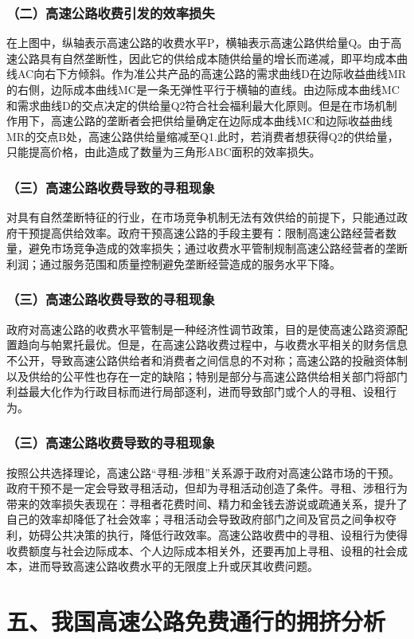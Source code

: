 \documentclass[aspectratio=169, 12pt]{beamer}
\begin{document}
\begin{frame}[plain]
    \frametitle{（二）高速公路收费引发的效率损失}
    在上图中，纵轴表示高速公路的收费水平P，横轴表示高速公路供给量Q。由于高速公路具有自然垄断性，因此它的供给成本随供给量的增长而递减，即平均成本曲线AC向右下方倾斜。作为准公共产品的高速公路的需求曲线D在边际收益曲线MR的右侧，边际成本曲线MC是一条无弹性平行于横轴的直线。由边际成本曲线MC和需求曲线D的交点决定的供给量Q2符合社会福利最大化原则。但是在市场机制作用下，高速公路的垄断者会把供给量确定在边际成本曲线MC和边际收益曲线MR的交点B处，高速公路供给量缩减至Q1.此时，若消费者想获得Q2的供给量，只能提高价格，由此造成了数量为三角形ABC面积的效率损失。
\end{frame}

\begin{frame}[plain]
    \frametitle{（三）高速公路收费导致的寻租现象}
    对具有自然垄断特征的行业，在市场竞争机制无法有效供给的前提下，只能通过政府干预提高供给效率。政府干预高速公路的手段主要有：限制高速公路经营者数量，避免市场竞争造成的效率损失；通过收费水平管制规制高速公路经营者的垄断利润；通过服务范围和质量控制避免垄断经营造成的服务水平下降。
\end{frame}

\begin{frame}[plain]
    \frametitle{（三）高速公路收费导致的寻租现象}
    政府对高速公路的收费水平管制是一种经济性调节政策，目的是使高速公路资源配置趋向与帕累托最优。但是，在高速公路收费过程中，与收费水平相关的财务信息不公开，导致高速公路供给者和消费者之间信息的不对称；高速公路的投融资体制以及供给的公平性也存在一定的缺陷；特别是部分与高速公路供给相关部门将部门利益最大化作为行政目标而进行局部逐利，进而导致部门或个人的寻租、设租行为。
\end{frame}

\begin{frame}[plain]
    \frametitle{（三）高速公路收费导致的寻租现象}
    按照公共选择理论，高速公路“寻租-涉租”关系源于政府对高速公路市场的干预。政府干预不是一定会导致寻租活动，但却为寻租活动创造了条件。寻租、涉租行为带来的效率损失表现在：寻租者花费时间、精力和金钱去游说或疏通关系，提升了自己的效率却降低了社会效率；寻租活动会导致政府部门之间及官员之间争权夺利，妨碍公共决策的执行，降低行政效率。高速公路收费中的寻租、设租行为使得收费额度与社会边际成本、个人边际成本相关外，还要再加上寻租、设租的社会成本，进而导致高速公路收费水平的无限度上升或厌其收费问题。
\end{frame}

\section{五、我国高速公路免费通行的拥挤分析}
\end{document}
